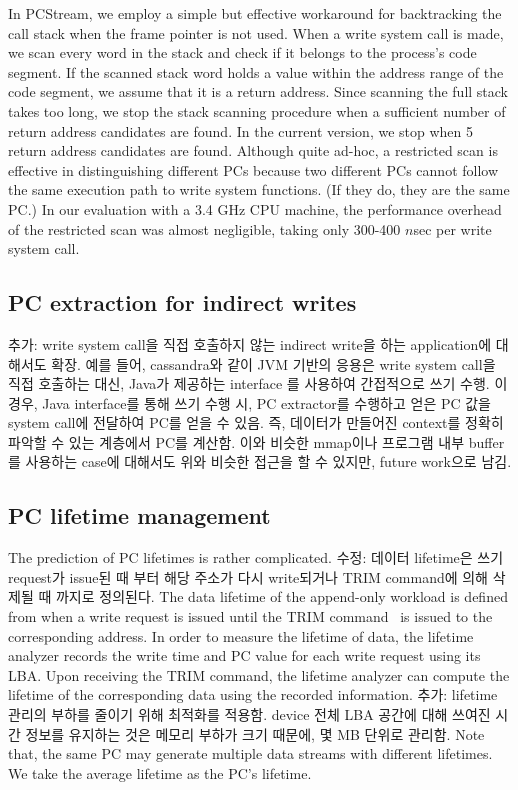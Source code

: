 In \textsf{\small PCStream}, we employ a simple but effective workaround 
for backtracking the call stack when the frame pointer is not used.
When a write system call is made, we scan every word in the stack and check
if it belongs to the process's code segment.  If the scanned stack word holds a
value within the address range of the code segment, we assume that it is a
return address.  Since scanning the full stack takes too long, we stop the
stack scanning procedure when a sufficient number of return address candidates
are found.  In the current version, we stop when 5 return address candidates
are found.  Although quite ad-hoc, a restricted scan is effective in
distinguishing different PCs because two different PCs
cannot follow the same execution path to write system functions.  
(If they do, they are the same PC.) In our evaluation
with a 3.4 GHz CPU machine, the performance overhead of the restricted scan was
almost negligible, taking only 300-400 $n$sec per write system call.

\subsection{PC extraction for indirect writes}
{\color{blue}추가: write system call을 직접 호출하지 않는 indirect write을 하는 application에 대해서도 확장.
예를 들어, cassandra와 같이 JVM 기반의 응용은 write system call을 직접 호출하는 대신, Java가 제공하는 interface
를 사용하여 간접적으로 쓰기 수행. 이 경우, Java interface를 통해 쓰기 수행 시, PC extractor를 수행하고
얻은 PC 값을 system call에 전달하여 PC를 얻을 수 있음.
즉, 데이터가 만들어진 context를 정확히 파악할 수 있는 계층에서 PC를 계산함.
이와 비슷한 mmap이나 프로그램 내부 buffer를 사용하는 case에 대해서도 위와 비슷한 접근을 할 수 있지만, 
future work으로 남김.}\\

\subsection{PC lifetime management}
The prediction of PC lifetimes is rather complicated. 
{\color{blue}수정: 데이터 lifetime은 쓰기 request가 issue된 때 부터 해당 주소가 다시 write되거나 
TRIM command에 의해 삭제될 때 까지로 정의된다.}
The data lifetime of the append-only workload is defined 
from when a write request is issued until the TRIM command~\cite{TRIM} is issued to 
the corresponding address.
In order to measure the lifetime of data, the lifetime analyzer 
records the write time and PC value for each write request using its LBA.
Upon receiving the TRIM command, the lifetime analyzer can compute the 
lifetime of the corresponding data using the recorded information.
{\color{blue} 추가: lifetime 관리의 부하를 줄이기 위해 최적화를 적용함.
device 전체 LBA 공간에 대해 쓰여진 시간 정보를 유지하는 것은 메모리 부하가 크기 때문에,
몇 MB 단위로 관리함.}
Note that, the
same PC may generate multiple data streams with different lifetimes.
We take the average lifetime as the PC's lifetime.

